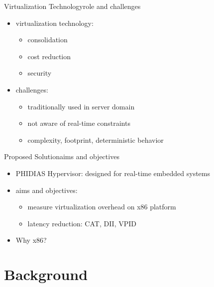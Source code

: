 \documentclass[10pt,hyperref={hyperfootnotes=false}, xcolor={usenames, dvipsnames}]{beamer}
\begin{document}
\begin{frame}{Virtualization Technology}{role and challenges}
  \begin{itemize}  
  \item {virtualization technology: \pause{} 
		  \begin{itemize}
      	   \item {consolidation} \pause{}
		   \item {cost reduction}  \pause{}
		   \item {security}  \pause{}
	      \end{itemize} 
		}	
  \item {challenges: 
          \begin{itemize}
      	   \item {traditionally used in server domain} \pause{}
		   \item {not aware of real-time constraints}  \pause{}
		   \item {complexity, footprint, deterministic behavior}
	      \end{itemize}
		}
  \end{itemize}
\end{frame}

\begin{frame}{Proposed Solution}{aims and objectives}
  \begin{itemize}
  \item {PHIDIAS Hypervisor: \pause{} designed for real-time embedded systems}  \pause{}
  \item {aims and objectives: \pause{}
	        \begin{itemize}
        	   \item {measure virtualization overhead on x86 platform}  \pause{} 
			   \item {latency reduction: \pause{} CAT, \pause{} DII, \pause{} VPID}  \pause{}
	        \end{itemize}
		}
  \item {Why x86?}
  \end{itemize}
\end{frame}

\section{Background}

\end{document}
